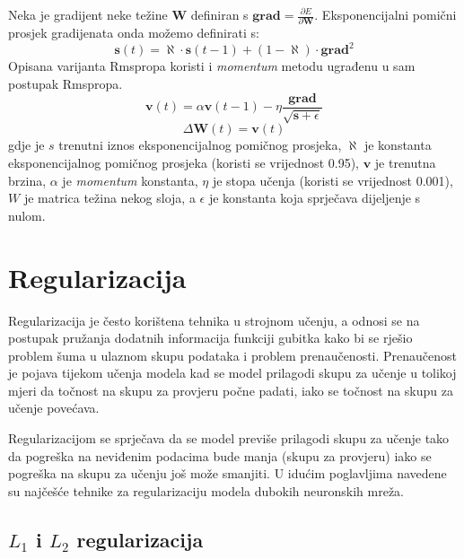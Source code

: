 \documentclass[times, utf8, diplomski, numeric]{fer}
\begin{document}
Neka je gradijent neke težine $\boldsymbol{W}$ definiran s $\boldsymbol{grad} = \frac{\partial E}{\partial \boldsymbol{W}}$. Eksponencijalni pomični prosjek gradijenata onda možemo definirati s:
\begin{equation}
  \boldsymbol{s}(t) = \aleph \cdot \boldsymbol{s}(t-1) + (1 - \aleph) \cdot \boldsymbol{grad}^2
\end{equation}
Opisana varijanta Rmspropa \cite{Graves13} koristi i \emph{momentum} metodu ugrađenu u sam postupak Rmspropa.
\begin{equation} %
  \boldsymbol{v}(t) = \alpha \boldsymbol{v}(t-1) - \eta \frac{\boldsymbol{grad}}{\sqrt{\boldsymbol{s} + \epsilon}}
\end{equation}
\begin{equation} %
  \Delta \boldsymbol{W}(t) = \boldsymbol{v}(t)
\end{equation}
gdje je $s$ trenutni iznos eksponencijalnog pomičnog prosjeka, $\aleph$ je konstanta eksponencijalnog pomičnog prosjeka (koristi se vrijednost 0.95),  $\boldsymbol{v}$ je trenutna brzina, $\alpha$ je \emph{momentum} konstanta, $\eta$ je stopa učenja (koristi se vrijednost 0.001), $W$ je matrica težina nekog sloja, a $\epsilon$ je konstanta koja sprječava dijeljenje s nulom.


\section{Regularizacija}

Regularizacija je često korištena tehnika u strojnom učenju, a odnosi se na postupak pružanja dodatnih informacija funkciji gubitka kako bi se rješio problem šuma u ulaznom skupu podataka i problem prenaučenosti. Prenaučenost je pojava tijekom učenja modela kad se model prilagodi skupu za učenje u tolikoj mjeri da točnost na skupu za provjeru  počne padati, iako se točnost na skupu za učenje povećava.

Regularizacijom se sprječava da se model previše prilagodi skupu za učenje tako da pogreška na neviđenim podacima bude manja (skupu za provjeru) iako se pogreška na skupu za učenju još može smanjiti. U idućim poglavljima navedene su najčešće tehnike za regularizaciju modela dubokih neuronskih mreža.

\subsection{$L_1$ i $L_2$ regularizacija}
\end{document}
